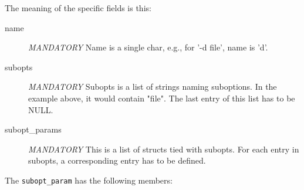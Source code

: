 The meaning of the specific fields is this:
\begin{description}
\item[name] {\em MANDATORY}
  Name is a single char, e.g., for '-d file', name is 'd'.

\item[subopts] {\em MANDATORY}
  Subopts is a list of strings naming suboptions. In the example above,
  it would contain "file". The last entry of this list has to be NULL.

\item[subopt\_params] {\em MANDATORY}
  This is a list of structs tied with subopts. For each entry in subopts,
  a corresponding entry has to be defined.
\end{description}


The {\tt subopt\_param} has the following members:
